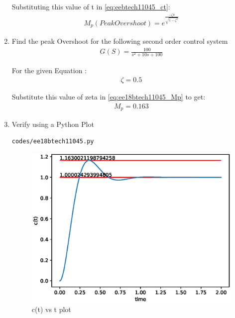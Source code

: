 \begin{enumerate}[label=\thesubsection.\arabic*.,ref=\thesubsection.\theenumi]
Substituting this value of t in \eqref{eq:eebtech11045_ct}:
\begin{align}
    M_p (PeakOvershoot) = e^{\frac{-\zeta\pi}{\sqrt{1-\zeta^2}}}
    \label{eq:ee18btech11045_Mp}
\end{align}

\item Find the peak Overshoot for the following second order control system
\begin{align}
    G(S) = \frac{100}{s^2 + 10s +100}    
\end{align}

\solution

For the given Equation : 
\begin{align}
   \zeta = 0.5
\end{align}

Substitute this value of zeta in \eqref{eq:ee18btech11045_Mp} to get:
\begin{align}
     M_p = 0.163
\end{align}

\item Verify using a Python Plot

\solution

\begin{lstlisting}
codes/ee18btech11045.py
\end{lstlisting}

\begin{figure}[!h]
    \centering
    \includegraphics[width=\columnwidth]{./figs/ee18btech11045/ee18btech11045.eps}
    \caption{c(t) vs t plot}
    \label{fig:ee18btech11045_plot} 
\end{figure}


\end{enumerate}